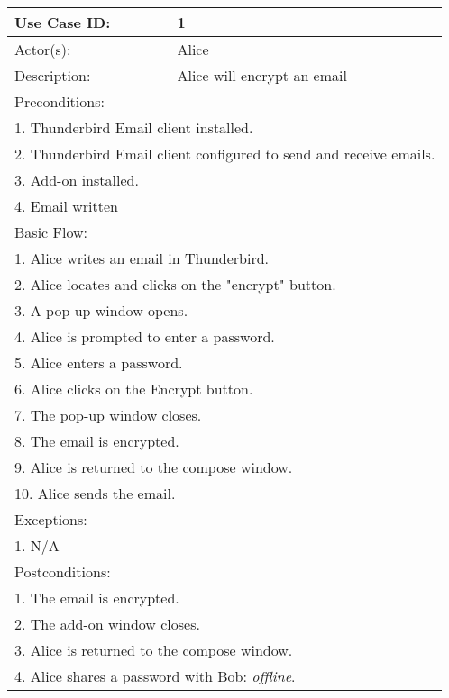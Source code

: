 \begin{longtable} {|p{3cm}|p{9cm}|} %
	\hline
Use Case ID: & 1\\
	\hline
Actor(s): & Alice \\
	\hline
Description: & Alice will encrypt an email \\
	\hline
	\multicolumn{2}{|l|}{Preconditions:} \\
	\multicolumn{2}{|l|}{1. Thunderbird Email client installed.} \\
	\multicolumn{2}{|l|}{2. Thunderbird Email client configured to send and receive emails.}\\
	\multicolumn{2}{|l|}{3. Add-on installed.} \\
	\multicolumn{2}{|l|}{4. Email written} \\
	\hline
	\multicolumn{2}{|l|}{Basic Flow:} \\
	\multicolumn{2}{|l|}{1. Alice writes an email in Thunderbird.}\\
	\multicolumn{2}{|l|}{2. Alice locates and clicks on the "encrypt" button.} \\
	\multicolumn{2}{|l|}{3. A pop-up window opens.} \\
	\multicolumn{2}{|l|}{4. Alice is prompted to enter a password.}\\
	\multicolumn{2}{|l|}{5. Alice enters a password.}\\
	\multicolumn{2}{|l|}{6. Alice clicks on the Encrypt button.}\\
	\multicolumn{2}{|l|}{7. The pop-up window closes.}\\
	\multicolumn{2}{|l|}{8. The email is encrypted.}\\
	\multicolumn{2}{|l|}{9. Alice is returned to the compose window.}\\
	\multicolumn{2}{|l|}{10. Alice sends the email.}\\
	
	\hline
	\hline
	\multicolumn{2}{|l|}{Exceptions:} \\
	\multicolumn{2}{|l|}{1. N/A} \\
	\hline
	\hline
	\multicolumn{2}{|l|}{Postconditions:} \\
	\multicolumn{2}{|l|}{1. The email is encrypted.} \\
	\multicolumn{2}{|l|}{2. The add-on window closes.} \\
	\multicolumn{2}{|l|}{3. Alice is returned to the compose window.} \\
	\multicolumn{2}{|l|}{4. Alice shares a password with Bob: \emph{offline}.}\\
	\hline
\end{longtable}

